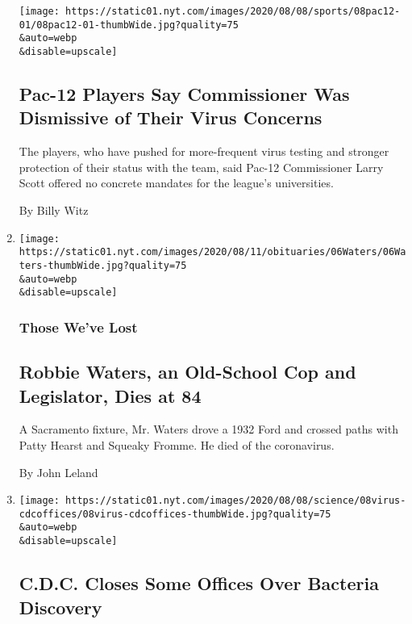 \begin{enumerate}
  \texttt{[image: https://static01.nyt.com/images/2020/08/08/sports/08pac12-01/08pac12-01-thumbWide.jpg?quality=75\\\&auto=webp\\\&disable=upscale]}

  \hypertarget{pac-12-players-say-commissioner-was-dismissive-of-their-virus-concerns}{%
  \subsection{Pac-12 Players Say Commissioner Was Dismissive of Their
  Virus
  Concerns}\label{pac-12-players-say-commissioner-was-dismissive-of-their-virus-concerns}}

  The players, who have pushed for more-frequent virus testing and
  stronger protection of their status with the team, said Pac-12
  Commissioner Larry Scott offered no concrete mandates for the league's
  universities.

  By Billy Witz
\item
  \href{/2020/08/08/obituaries/robbie-waters-dead-coronavirus.html}{}

  \texttt{[image: https://static01.nyt.com/images/2020/08/11/obituaries/06Waters/06Waters-thumbWide.jpg?quality=75\\\&auto=webp\\\&disable=upscale]}

  \hypertarget{those-weve-lost}{%
  \subsubsection{Those We've Lost}\label{those-weve-lost}}

  \hypertarget{robbie-waters-an-old-school-cop-and-legislator-dies-at-84}{%
  \subsection{Robbie Waters, an Old-School Cop and Legislator, Dies at
  84}\label{robbie-waters-an-old-school-cop-and-legislator-dies-at-84}}

  A Sacramento fixture, Mr. Waters drove a 1932 Ford and crossed paths
  with Patty Hearst and Squeaky Fromme. He died of the coronavirus.

  By John Leland
\item
  \href{/2020/08/08/health/cdc-legionnaires-coronavirus.html}{}

  \texttt{[image: https://static01.nyt.com/images/2020/08/08/science/08virus-cdcoffices/08virus-cdcoffices-thumbWide.jpg?quality=75\\\&auto=webp\\\&disable=upscale]}

  \hypertarget{cdc-closes-some-offices-over-bacteria-discovery}{%
  \subsection{C.D.C. Closes Some Offices Over Bacteria
  Discovery}\label{cdc-closes-some-offices-over-bacteria-discovery}}


\end{enumerate}
